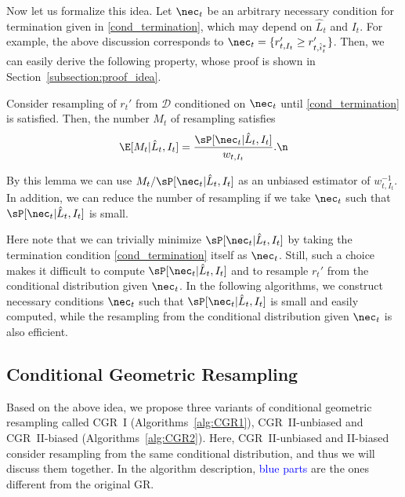 Now let us formalize this idea.
Let $\nec_{t}$ be an arbitrary necessary condition for termination given in \eqref{cond_termination}, which may depend on $\hat{L}_t$ and $I_t$.
For example, the above discussion corresponds to $\nec_{t}=\{r'_{t,I_t}\ge r'_{t,\hat{i}_t^*}\}$.
Then, we can easily derive the following property, whose proof is shown in Section~\ref{subsection:proof_idea}.
\begin{lemma}\label{lem: general idea}
Consider resampling of $r_t'$ from $\mathcal{D}$ conditioned on
$\nec_t$ until \eqref{cond_termination} is satisfied.
Then, the number $M_t$ of resampling satisfies
\begin{align}
\E[M_t|\hat{L}_t, I_t]=\frac{\sP[\nec_t|\hat{L}_t, I_t]}{w_{t,I_t}}.\n
\end{align}
\end{lemma}
By this lemma we can use $M_t/\sP[\nec_t|\hat{L}_t, I_t]$ as an unbiased estimator
of $w_{t,I_t}^{-1}$.
In addition, we can reduce the number of resampling if we take $\nec_t$ such that
$\sP[\nec_t|\hat{L}_t, I_t]$ is small.

Here note that we can trivially minimize $\sP[\nec_t|\hat{L}_t, I_t]$
by taking the termination condition \eqref{cond_termination} itself as $\nec_t$.
Still, such a choice makes it difficult to compute $\sP[\nec_t|\hat{L}_t, I_t]$
and to resample $r_t'$ from the conditional distribution given $\nec_t$.
In the following algorithms, we construct necessary conditions $\nec_t$ such that
$\sP[\nec_t|\hat{L}_t, I_t]$ is small and easily computed, while
the resampling from the conditional distribution given $\nec_t$ is also efficient.

\subsection{Conditional Geometric Resampling}
Based on the above idea, we propose three variants of conditional geometric resampling
called CGR~I (Algorithms~\ref{alg:CGR1}), CGR~II-unbiased and CGR~II-biased (Algorithms~\ref{alg:CGR2}).
Here, CGR~II-unbiased and
II-biased consider resampling
from
the same conditional distribution, and thus we will discuss them together.
In the algorithm description, \textcolor{blue}{blue parts} are the ones different from the original GR.

